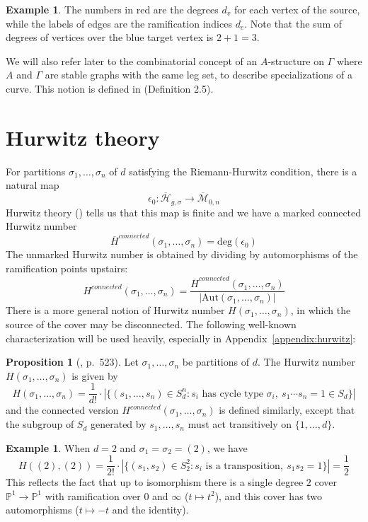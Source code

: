 \documentclass[thesis]{thesis-umich}           %
\newcommand{\Aut}{\text{Aut}}
\newcommand{\Hb}{\overline{\mathcal H}}
\renewcommand{\P}{\mathbb P}
\theoremstyle{definition}
\newtheorem{prop}[thm]{Proposition}
\newtheorem{eg}[thm]{Example}
\begin{document}
\begin{eg}

                                      The numbers in red are the degrees $d_v$ for each vertex of the
                                      source, while the labels of edges
                                      are the ramification indices $d_e$.
                                      Note that the sum of degrees of
                                      vertices over the blue target
                                      vertex is $2+1=3$.

\end{eg}

We will also refer later to the combinatorial concept
of an $A$-structure on $\Gamma$ where $A$ and $\Gamma$
are stable graphs with the same leg set, to describe
specializations of a curve. This notion is
defined in \cite{Schmitt} (Definition 2.5).

\section{Hurwitz theory}

For partitions $\sigma_1,\dots,\sigma_n$ of $d$
satisfying the Riemann-Hurwitz condition, there is a natural map
\[
\epsilon_0:\Hb_{g,\sigma}\to\overline{\mathcal M}_{0,n}
\]
Hurwitz theory (\cite{Cela}) tells us that this map is finite and we have a marked connected Hurwitz number
\[\overline H^{connected}(\sigma_1,\dots,\sigma_n)=\text{deg}(\epsilon_0)\]
The unmarked Hurwitz number is obtained by dividing by automorphisms of the ramification points upstairs:
\[
H^{connected}(\sigma_1,\dots,\sigma_n)=\frac{\overline H^{connected}(\sigma_1,\dots,\sigma_n)}{|\Aut(\sigma_1,\dots,\sigma_n)|}
\]
There is a more general notion of Hurwitz number $H(\sigma_1,\dots,\sigma_n)$, in which the source of
the cover may be disconnected.
The following well-known characterization will be used heavily,
especially in Appendix~\ref{appendix:hurwitz}:
\begin{prop}[\cite{Completed}, p.\ 523]
  Let $\sigma_1,\dots,\sigma_n$ be partitions of $d$. The Hurwitz number $H(\sigma_1,\dots,\sigma_n)$ is given by
  \[
  H(\sigma_1,\dots,\sigma_n)=\frac 1{d!}\cdot |\{(s_1,\dots,s_n)\in S_d^n:s_i\text{ has cycle type }\sigma_i,\ s_1\cdots s_n=1\in S_d\}|
  \]
  and the connected version $H^{connected}(\sigma_1,\dots,\sigma_n)$ is defined
  similarly, except that the subgroup of $S_d$ generated by $s_1,\dots,s_n$
  must act transitively on $\{1,\dots,d\}$.
\end{prop}
\begin{eg}
  When $d=2$ and $\sigma_1=\sigma_2=(2)$, we have
  \[
  H((2),(2))=\frac 1{2!}\cdot |\{(s_1,s_2)\in S_2^2:s_i\text{ is a transposition},\ s_1s_2=1\}|=\frac 12
  \]
  This reflects the fact that up to isomorphism there is a single degree $2$ cover $\P^1\to\P^1$ with ramification over $0$ and $\infty$ ($t\mapsto t^2$), and this cover has two automorphisms ($t\mapsto -t$ and the identity).
  \end{eg}
\end{document}
